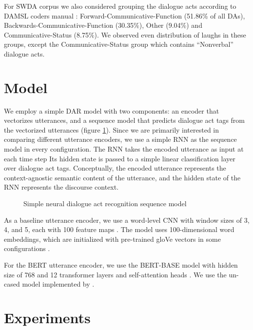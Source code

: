 \documentclass[11pt,a4paper]{article}
\begin{document}
For SWDA corpus we also considered grouping the dialogue acts according to DAMSL coders manual \citep{jurafskySwitchboardSWBDDAMSLShallowDiscourseFunction1997a}: Forward-Communicative-Function (51.86\% of all DAs), Backwards-Communicative-Function (30.35\%), Other (9.04\%) and Communicative-Status (8.75\%). We observed even distribution of laughs in these groups, except the Communicative-Status group which contains ``Nonverbal'' dialogue acts.

  
\section{Model} %

We employ a simple DAR model with two components: an encoder that vectorizes utterances, and a sequence model that predicts dialogue act tags from the vectorized utterances (figure \ref{fig:model-architecture}).
Since we are primarily interested in comparing different utterance encoders, we use a simple RNN as the sequence model in every configuration. 
The RNN takes the encoded utterance as input at each time step
Its hidden state is passed to a simple linear classification layer over dialogue act tags.
Conceptually, the encoded utterance represents the context-agnostic semantic content of the utterance, and the hidden state of the RNN represents the discourse context.

\begin{figure}
  
  \caption{Simple neural dialogue act recognition sequence model}
  \label{fig:model-architecture}
\end{figure}

As a baseline utterance encoder, we use a word-level CNN with window sizes of 3, 4, and 5, each with 100 feature maps \citep{kimConvolutionalNeuralNetworks2014}. 
The model uses 100-dimensional word embeddings, which are initialized with pre-trained gloVe vectors in some configurations \citep{penningtonGloveGlobalVectors2014}.

For the BERT utterance encoder, we use the BERT-BASE model with hidden size of 768 and 12 transformer layers and self-attention heads \citep[][see \S3.1]{devlinBERTPretrainingDeep2018}.
We use the un-cased model implemented by \citet{wolfHuggingFaceTransformersStateoftheart2019}.

\section{Experiments}
\end{document}
